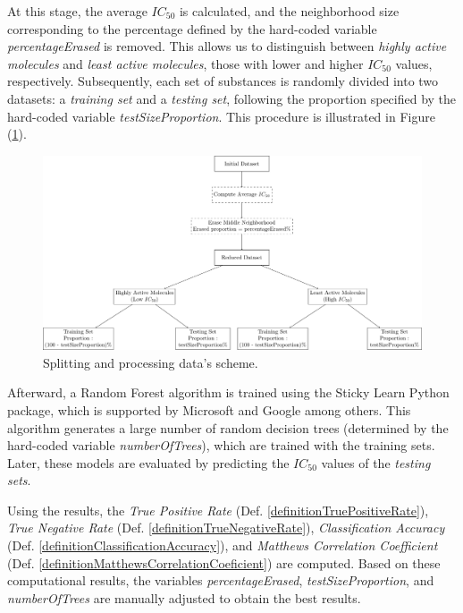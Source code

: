 \documentclass[11pt]{article}
\begin{document}
At this stage, the average $IC_{50}$ is calculated, and the neighborhood size corresponding to the percentage defined by the hard-coded variable \emph{percentageErased} is removed. This allows us to distinguish between \emph{highly active molecules} and \emph{least active molecules}, those with lower and higher $IC_{50}$ values, respectively. Subsequently, each set of substances is randomly divided into two datasets: a \emph{training set} and a \emph{testing set}, following the proportion specified by the hard-coded variable \emph{testSizeProportion}. This procedure is illustrated in Figure (\ref{FigureDataSplittingDiagram}).
\begin{figure}[H]
\centering
\includegraphics[width = \textwidth]{GeneralSources/DataSplittingDiagram.pdf}
\caption{Splitting and processing data's scheme.}
\label{FigureDataSplittingDiagram}
\end{figure}
Afterward, a Random Forest algorithm is trained using the Sticky Learn \cite{PythonPackageStickitLearn} Python package, which is supported by Microsoft and Google among others. This algorithm generates a large number of random decision trees (determined by the hard-coded variable \emph{numberOfTrees}), which are trained with the training sets. Later, these models are evaluated by predicting the $IC_{50}$ values of the \emph{testing sets}.

Using the results, the \emph{True Positive Rate} (Def. \ref{definitionTruePositiveRate}), \emph{True Negative Rate} (Def. \ref{definitionTrueNegativeRate}), \emph{Classification Accuracy} (Def. \ref{definitionClassificationAccuracy}), and \emph{Matthews Correlation Coefficient} (Def. \ref{definitionMatthewsCorrelationCoeficient}) are computed. Based on these computational results, the variables \emph{percentageErased}, \emph{testSizeProportion}, and \emph{numberOfTrees} are manually adjusted to obtain the best results.
\end{document}
